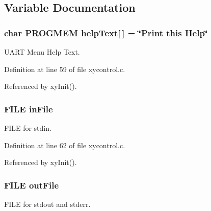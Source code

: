 \subsection{Variable Documentation}
\hypertarget{group__xycontrol_gab29cf1c6b0f1a36311899902ec9364ea}{
\subsubsection[{help\-Text}]{\setlength{\rightskip}{0pt plus 5cm}char P\-R\-O\-G\-M\-E\-M help\-Text\mbox{[}$\,$\mbox{]} = \char`\"{}Print this Help\char`\"{}}}\label{group__xycontrol_gab29cf1c6b0f1a36311899902ec9364ea}


U\-A\-R\-T Menu Help Text. 



Definition at line 59 of file xycontrol.\-c.



Referenced by xy\-Init().

\hypertarget{group__xycontrol_gaad0ab56da43b41bbfeeaa3d1eca70e9c}{
\subsubsection[{in\-File}]{\setlength{\rightskip}{0pt plus 5cm}F\-I\-L\-E in\-File}}\label{group__xycontrol_gaad0ab56da43b41bbfeeaa3d1eca70e9c}


F\-I\-L\-E for stdin. 



Definition at line 62 of file xycontrol.\-c.



Referenced by xy\-Init().

\hypertarget{group__xycontrol_gaa9e0cac6f45e381f488c1dd9a8418ca2}{
\subsubsection[{out\-File}]{\setlength{\rightskip}{0pt plus 5cm}F\-I\-L\-E out\-File}}\label{group__xycontrol_gaa9e0cac6f45e381f488c1dd9a8418ca2}


F\-I\-L\-E for stdout and stderr. 



